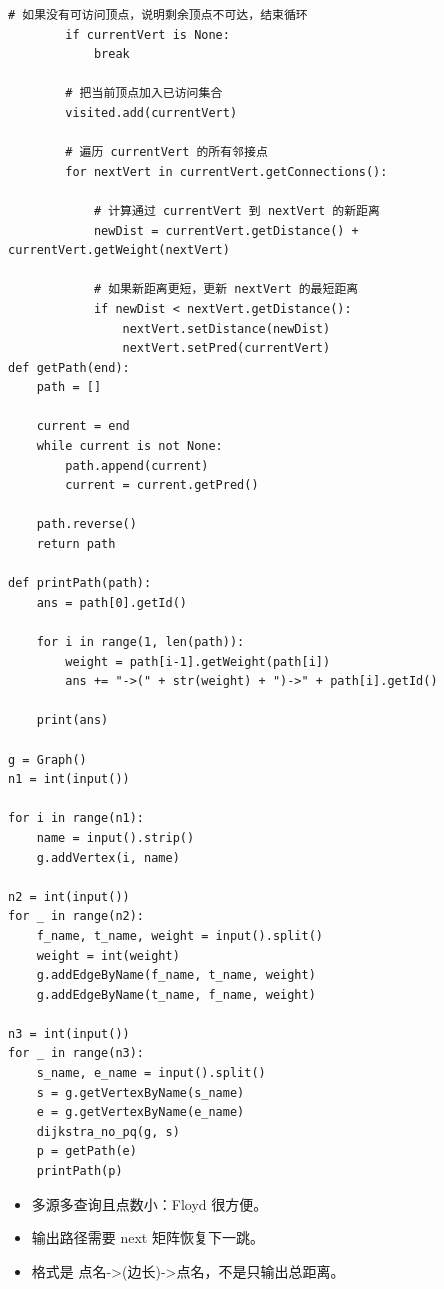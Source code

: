 \documentclass[10pt,a4paper,fontset=none]{ctexart}
\begin{document}
\begin{lstlisting}[style=py,caption={最终可用代码（对话来源）}]
        # 如果没有可访问顶点，说明剩余顶点不可达，结束循环
        if currentVert is None:
            break

        # 把当前顶点加入已访问集合
        visited.add(currentVert)

        # 遍历 currentVert 的所有邻接点
        for nextVert in currentVert.getConnections():

            # 计算通过 currentVert 到 nextVert 的新距离
            newDist = currentVert.getDistance() + currentVert.getWeight(nextVert)

            # 如果新距离更短，更新 nextVert 的最短距离
            if newDist < nextVert.getDistance():
                nextVert.setDistance(newDist)
                nextVert.setPred(currentVert)
def getPath(end):
    path = []

    current = end
    while current is not None:
        path.append(current)
        current = current.getPred()

    path.reverse()
    return path

def printPath(path):
    ans = path[0].getId()

    for i in range(1, len(path)):
        weight = path[i-1].getWeight(path[i])
        ans += "->(" + str(weight) + ")->" + path[i].getId()

    print(ans)

g = Graph()
n1 = int(input())

for i in range(n1):
    name = input().strip()
    g.addVertex(i, name)

n2 = int(input())
for _ in range(n2):
    f_name, t_name, weight = input().split()
    weight = int(weight)
    g.addEdgeByName(f_name, t_name, weight)
    g.addEdgeByName(t_name, f_name, weight)

n3 = int(input())
for _ in range(n3):
    s_name, e_name = input().split()
    s = g.getVertexByName(s_name)
    e = g.getVertexByName(e_name)
    dijkstra_no_pq(g, s)
    p = getPath(e)
    printPath(p)
\end{lstlisting}
\begin{notebox}
\begin{itemize}
  \item 多源多查询且点数小：Floyd 很方便。
  \item 输出路径需要 next 矩阵恢复下一跳。
  \item 格式是 点名->(边长)->点名，不是只输出总距离。
\end{itemize}
\end{notebox}
\end{document}
